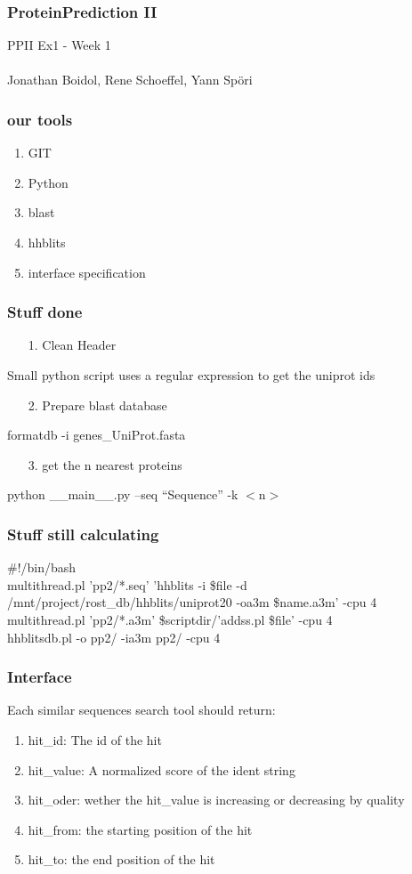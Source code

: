 \documentclass{beamer}
\begin{document}
\begin{frame}
 \frametitle{ProteinPrediction II}
 PPII Ex1 - Week 1\\
 \hfill \\
 Jonathan Boidol, Rene Schoeffel, Yann Sp\"ori
\end{frame}

\begin{frame}
 \frametitle{our tools}
 \begin{enumerate}
  \item GIT
  \item Python
  \item blast
  \item hhblits
  \item interface specification
 \end{enumerate}

\end{frame}

\begin{frame}
 \frametitle{Stuff done}
 \begin{enumerate}
  \item[1.] Clean Header
 \end{enumerate}
 Small python script uses a regular expression to get the uniprot ids
 \begin{enumerate}
  \item[2.] Prepare blast database
 \end{enumerate}
 formatdb -i genes\_UniProt.fasta
 \begin{enumerate}
  \item[3.] get the n nearest proteins
 \end{enumerate}
 python \_\_main\_\_.py --seq ``Sequence'' -k $<$n$>$
\end{frame}

\begin{frame}
 \frametitle{Stuff still calculating}

\#!/bin/bash\\
multithread.pl 'pp2/*.seq' 'hhblits -i \$file -d /mnt/project/rost\_db/hhblits/uniprot20 -oa3m \$name.a3m' -cpu 4\\
multithread.pl 'pp2/*.a3m' \$scriptdir/'addss.pl \$file' -cpu 4\\
hhblitsdb.pl -o pp2/ -ia3m pp2/ -cpu 4

\end{frame}


\begin{frame}
 \frametitle{Interface}
  Each similar sequences search tool should return:\\
  \begin{enumerate}
   \item hit\_id: The id of the hit
   \item hit\_value: A normalized score of the ident string
   \item hit\_oder: wether the hit\_value is increasing or decreasing by quality
   \item hit\_from: the starting position of the hit
   \item hit\_to: the end position of the hit
  \end{enumerate}

\end{frame}
\end{document}
